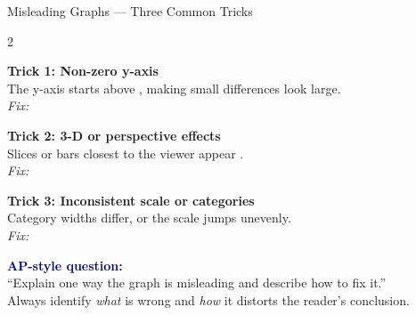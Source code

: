 \documentclass[10pt]{article}
\begin{document}
\vspace{0.1in}

\begin{notesbox}{Misleading Graphs --- Three Common Tricks}
\small

\begin{multicols}{2}

\textbf{Trick 1: Non-zero y-axis}\\
The y-axis starts above \blank{1cm}, making small differences look large.\\[4pt]
\textit{Fix:} \blank{3.5cm}

\vspace{8pt}
\textbf{Trick 2: 3-D or perspective effects}\\
Slices or bars closest to the viewer appear \blank{2cm}.\\[4pt]
\textit{Fix:} \blank{3.5cm}

\columnbreak

\textbf{Trick 3: Inconsistent scale or categories}\\
Category widths differ, or the scale jumps unevenly.\\[4pt]
\textit{Fix:} \blank{3.5cm}

\vspace{8pt}
\textbf{\textcolor{navy}{AP-style question:}}\\
``Explain one way the graph is misleading and describe how to fix it.''\\[4pt]
Always identify \textit{what} is wrong and \textit{how} it distorts the reader's conclusion.

\end{multicols}
\end{notesbox}

\vspace{0.1in}
\end{document}
